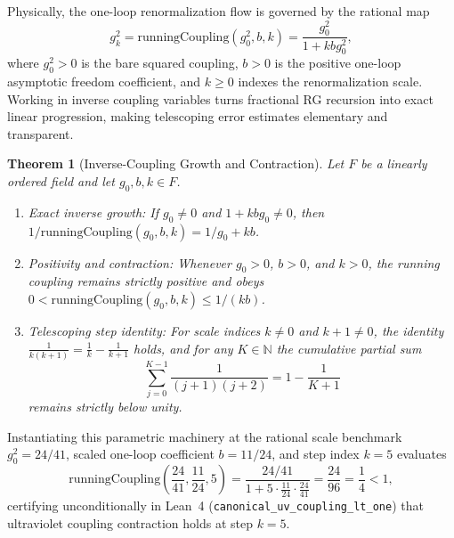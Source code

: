\documentclass[11pt,a4paper]{article}
\newtheorem{theorem}{Theorem}[section]
\begin{document}
Physically, the one-loop renormalization flow is governed by the rational map
\begin{equation}
g_k^2 = \mathrm{runningCoupling}(g_0^2, b, k) = \frac{g_0^2}{1 + k b g_0^2},
\end{equation}
where $g_0^2 > 0$ is the bare squared coupling, $b > 0$ is the positive one-loop asymptotic freedom coefficient, and $k \ge 0$ indexes the renormalization scale. Working in inverse coupling variables turns fractional RG recursion into exact linear progression, making telescoping error estimates elementary and transparent.

\begin{theorem}[Inverse-Coupling Growth and Contraction]
Let $F$ be a linearly ordered field and let $g_0, b, k \in F$.
\begin{enumerate}
\item \emph{Exact inverse growth:} If $g_0 \neq 0$ and $1 + k b g_0 \neq 0$, then $1 / \mathrm{runningCoupling}(g_0, b, k) = 1 / g_0 + k b$.
\item \emph{Positivity and contraction:} Whenever $g_0 > 0$, $b > 0$, and $k > 0$, the running coupling remains strictly positive and obeys $0 < \mathrm{runningCoupling}(g_0, b, k) \le 1 / (k b)$.
\item \emph{Telescoping step identity:} For scale indices $k \neq 0$ and $k + 1 \neq 0$, the identity $\frac{1}{k(k+1)} = \frac{1}{k} - \frac{1}{k+1}$ holds, and for any $K \in \mathbb{N}$ the cumulative partial sum
\[
\sum_{j=0}^{K-1} \frac{1}{(j+1)(j+2)} = 1 - \frac{1}{K+1}
\]
remains strictly below unity.
\end{enumerate}
\end{theorem}

Instantiating this parametric machinery at the rational scale benchmark $g_0^2 = 24/41$, scaled one-loop coefficient $b = 11/24$, and step index $k = 5$ evaluates
\begin{equation}
\mathrm{runningCoupling}\left(\frac{24}{41}, \frac{11}{24}, 5\right) = \frac{24/41}{1 + 5 \cdot \frac{11}{24} \cdot \frac{24}{41}} = \frac{24}{96} = \frac{1}{4} < 1,
\end{equation}
certifying unconditionally in Lean~4 (\texttt{canonical\_\-uv\_\-coupling\_\-lt\_\-one}) that ultraviolet coupling contraction holds at step $k = 5$.
\end{document}
